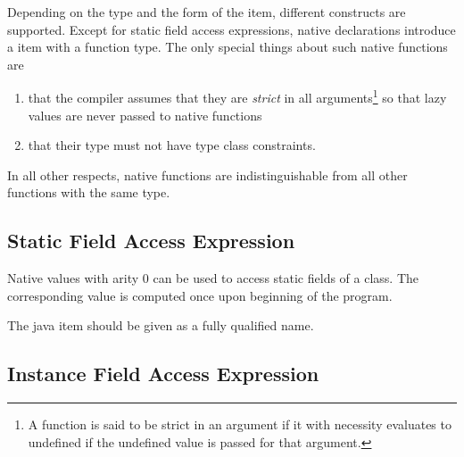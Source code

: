 Depending on the type and the form of the \java{} item, different \java{} constructs are supported. Except for static field access expressions, native declarations introduce a \frege{} item with a function type. The only special things about such native functions are
\begin{enumerate}
\item that the compiler assumes that they are \emph{strict} in all arguments\footnote{A function is said to be strict in an argument if it with necessity evaluates to undefined if the undefined value is passed for that argument.}
so that lazy values are never passed to native functions
\item that their type must not have type class constraints.
\end{enumerate}
In all other respects, native functions are indistinguishable from all other functions with the same type.

\subsection{Static Field Access Expression}

Native values with arity 0 can be used to access static fields of a \java{} class. 
The corresponding \frege{} value is computed once upon beginning of the program.



The java item should be given as a fully qualified name.


\subsection{Instance Field Access Expression}

